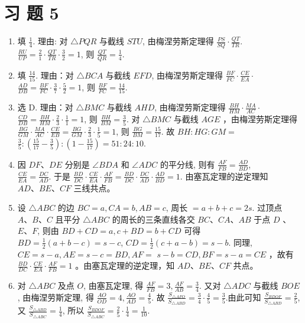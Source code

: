 \documentclass[10pt]{article}
\begin{document}
\section*{习 题 5}
\begin{enumerate}
  \item 填 $\frac{1}{4}$. 理由: 对 $\triangle P Q R$ 与截线 $S T U$, 由梅涅劳斯定理得 $\frac{P S}{S Q} \cdot \frac{Q T}{T R}$. $\frac{R U}{U P}=\frac{2}{1} \cdot \frac{Q T}{T R} \cdot \frac{3}{2}=1$, 则 $\frac{Q T}{Q R}=\frac{1}{4}$.
  \item 填 $\frac{14}{15}$. 理由：对 $\triangle B C A$ 与截线 $E F D$, 由梅涅劳斯定理得 $\frac{B F}{F C} \cdot \frac{C E}{E A} \cdot$ $\frac{A D}{D B}=\frac{B F}{F C} \cdot \frac{3}{7} \cdot \frac{5}{2}=1$, 则 $\frac{B F}{F C}=\frac{14}{15}$.
  \item 选 D. 理由：对 $\triangle B M C$ 与截线 $A H D$, 由梅涅劳斯定理得 $\frac{B H}{H M} \cdot \frac{M A}{A C} \cdot$ $\frac{C D}{D B}=\frac{B H}{H M} \cdot \frac{2}{3} \cdot \frac{1}{1}=1$, 则 $\frac{B H}{B M}=\frac{3}{5}$. 对 $\triangle B M C$ 与截线 $A G E$ ，由梅涅劳斯定理得 $\frac{B G}{G M} \cdot \frac{M A}{A C} \cdot \frac{C E}{E B}=\frac{B G}{G M} \cdot \frac{2}{3} \cdot \frac{1}{5}=1$, 则 $\frac{B G}{B M}=\frac{15}{17}$. 故 $B H: H G: G M=$ $\frac{3}{5}:\left(\frac{15}{17}-\frac{3}{5}\right):\left(1-\frac{15}{17}\right)=51: 24: 10$.
  \item 因 $D F 、 D E$ 分别是 $\angle B D A$ 和 $\angle A D C$ 的平分线, 则有 $\frac{A F}{F B}=\frac{A D}{B D}$,\\
$\frac{C E}{E A}=\frac{D C}{A D}$. 于是 $\frac{B D}{D C} \cdot \frac{C E}{E A} \cdot \frac{A F}{F B}=\frac{B D}{D C} \cdot \frac{D C}{A D} \cdot \frac{A D}{B D}=1$. 由塞瓦定理的逆定理知 $A D 、 B E 、 C F$ 三线共点。
  \item 设 $\triangle A B C$ 的边 $B C=a, C A=b, A B=c$, 周长 $=a+b+c=2 s$. 过顶点 $A 、 B 、 C$ 且平分 $\triangle A B C$ 的周长的三条直线各交 $B C 、 C A 、 A B$ 于点 $D$ 、 $E 、 F$, 则由 $B D+C D=a, c+B D=b+C D$ 可得 $B D=\frac{1}{2}(a+b-c)=s-c$, $C D=\frac{1}{2}(c+a-b)=s-b$. 同理, $C E=s-a, A E=s-c=B D, A F=$ $s-b=C D, B F=s-a=C E$ ，故有 $\frac{B D}{D C} \cdot \frac{C E}{E A} \cdot \frac{A F}{F B}=1$ 。由塞瓦定理的逆定理，知 $A D 、 B E 、 C F$ 共点。
  \item 对 $\triangle A B C$ 及点 $O$, 由塞瓦定理, 得 $\frac{A F}{F B}=3, \frac{A F}{A B}=\frac{3}{4}$. 又对 $\triangle A D C$ 与截线 $B O E$, 由梅涅劳斯定理, 得 $\frac{A O}{O D}=4, \frac{A O}{A D}=\frac{4}{5}$. 故 $\frac{S_{\triangle A F O}}{S_{\triangle A B D}}=\frac{3}{4} \cdot \frac{4}{5}=\frac{3}{5}$.由此可知 $\frac{S_{B D O F}}{S_{\triangle A B D}}=\frac{2}{5}$, 又 $\frac{S_{\triangle A B D}}{S_{\triangle A B C}}=\frac{1}{4}$, 所以 $\frac{S_{B D O F}}{S_{\triangle A B C}}=\frac{2}{5} \cdot \frac{1}{4}=\frac{1}{10}$.

\end{enumerate}
\end{document}

